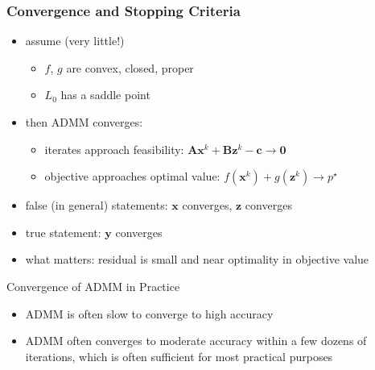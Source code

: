 \documentclass[aspectratio=169]{beamer}
\begin{document}
                \begin{frame}
                  \frametitle{Convergence and Stopping Criteria}
                  \begin{itemize}
                    \item assume (very little!)
                      \begin{itemize}
                        \item $f$, $g$ are convex, closed, proper %
                        \item $L_{0}$ has a saddle point %
                      \end{itemize}
                    \item then ADMM converges:
                      \begin{itemize}
                        \item iterates approach feasibility: $\bm A \bm x^k + \bm B \bm z^k - \bm c \rightarrow \bm 0$
                        \item objective approaches optimal value: $f(\bm x^k) + g(\bm z^k) \rightarrow p^\star$
                      \end{itemize}
                    \item false (in general) statements: $\bm x$ converges, $\bm z$ converges
                    \item true statement: $\bm y$ converges
                    \item what matters: residual is small and near optimality in objective value
                  \end{itemize}
                \end{frame}

                \begin{frame}{Convergence of ADMM in Practice}
                  \begin{itemize}
                    \item ADMM is often slow to converge to high accuracy
                    \item ADMM often converges to moderate accuracy within a few dozens of iterations, which is often sufficient
                    for most practical purposes 
                  \end{itemize}
                \end{frame}
\end{document}
